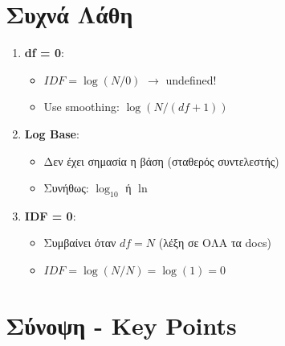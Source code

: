 \section{Συχνά Λάθη}

\begin{warningbox}
\begin{enumerate}
    \item \textbf{df = 0}:
    \begin{itemize}
        \item[$\times$] $IDF = \log(N/0)$ $\to$ undefined!
        \item[\checkmark] Use smoothing: $\log(N/(df+1))$
    \end{itemize}

    \item \textbf{Log Base}:
    \begin{itemize}
        \item Δεν έχει σημασία η βάση (σταθερός συντελεστής)
        \item Συνήθως: $\log_{10}$ ή $\ln$
    \end{itemize}

    \item \textbf{IDF = 0}:
    \begin{itemize}
        \item Συμβαίνει όταν $df = N$ (λέξη σε ΟΛΑ τα docs)
        \item $IDF = \log(N/N) = \log(1) = 0$
    \end{itemize}
\end{enumerate}
\end{warningbox}

\section{Σύνοψη - Key Points}

